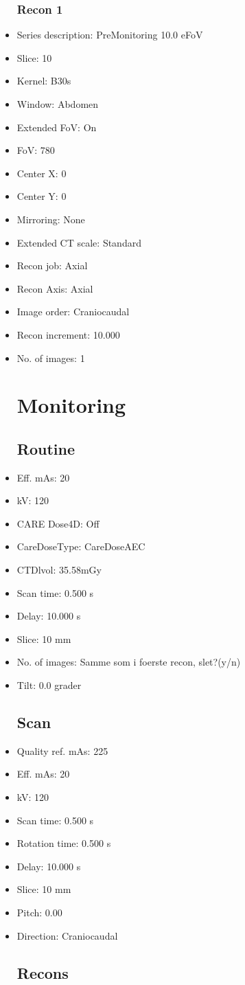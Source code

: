 \documentclass[12pt]{article}
\begin{document}
\begin{itemize}
\subsubsection{Recon 1}
\item Series description: PreMonitoring 10.0 eFoV
\item Slice: 10
\item Kernel: B30s
\item Window: Abdomen
\item Extended FoV: On
\item FoV: 780
\item Center X: 0
\item Center Y: 0
\item Mirroring: None
\item Extended CT scale: Standard
\item Recon job: Axial
\item Recon Axis: Axial
\item Image order: Craniocaudal
\item Recon increment: 10.000
\item No. of images: 1
\section{Monitoring}
\subsection{Routine}
\item Eff. mAs: 20\item kV: 120\item CARE Dose4D: Off\item CareDoseType: CareDoseAEC\item CTDlvol: 35.58mGy\item Scan time: 0.500 s\item Delay: 10.000 s\item Slice: 10 mm\item No. of images: Samme som i foerste recon, slet?(y/n)\item Tilt: 0.0 grader
\subsection{Scan}
\item Quality ref. mAs: 225\item Eff. mAs: 20\item kV: 120\item Scan time: 0.500 s\item Rotation time: 0.500 s\item Delay: 10.000 s\item Slice: 10 mm\item Pitch: 0.00\item Direction: Craniocaudal\subsection{Recons}


\end{itemize}
\end{document}
